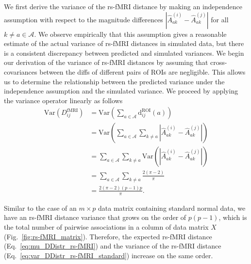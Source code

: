 \documentclass[aos]{imsart}
\begin{document}
We first derive the variance of the rs-fMRI distance by making an independence assumption with respect to the magnitude differences $|\hat{A}^{(i)}_{ak} - \hat{A}^{(j)}_{ak}|$ for all $k \neq a \in \mathcal{A}$. We observe empirically that this assumption gives a reasonable estimate of the actual variance of rs-fMRI distances in simulated data, but there is a consistent discrepancy between predicted and simulated variances. We begin our derivation of the variance of rs-fMRI distances by assuming that cross-covariances between the diffs of different pairs of ROIs are negligible. This allows us to determine the relationship between the predicted variance under the independence assumption and the simulated variance. We proceed by applying the variance operator linearly as follows
%
\begin{equation}\label{eq:var_DDistr_rs-fMRI_standard}
\begin{aligned}
\text{Var}(D^\text{fMRI}_{ij}) &= \text{Var}\left(\sum_{a \in \mathcal{A}} \text{d}^\text{ROI}_{ij}(a)\right) \\
&= \text{Var}\left(\sum_{a \in \mathcal{A}} \sum_{k \neq a} \left|\hat{A}^{(i)}_{ak} - \hat{A}^{(j)}_{ak}\right|\right) \\
&= \sum_{a \in \mathcal{A}} \sum_{k \neq a} \text{Var}\left(\left|\hat{A}^{(i)}_{ak} - \hat{A}^{(j)}_{ak}\right|\right) \\
&= \sum_{a \in \mathcal{A}} \sum_{k \neq a} \frac{2(\pi - 2)}{\pi} \\
&= \frac{2(\pi - 2)(p-1)p}{\pi}.
\end{aligned}
\end{equation}

Similar to the case of an $m \times p$ data matrix containing standard normal data, we have an rs-fMRI distance variance that grows on the order of $p(p - 1)$, which is the total number of pairwise associations in a column of data matrix $X$ (Fig.~\ref{fig:rs-fMRI_matrix}). Therefore, the expected rs-fMRI distance (Eq.~\ref{eq:mu_DDistr_rs-fMRI}) and the variance of the rs-fMRI distance (Eq.~\ref{eq:var_DDistr_rs-fMRI_standard}) increase on the same order.
\end{document}
